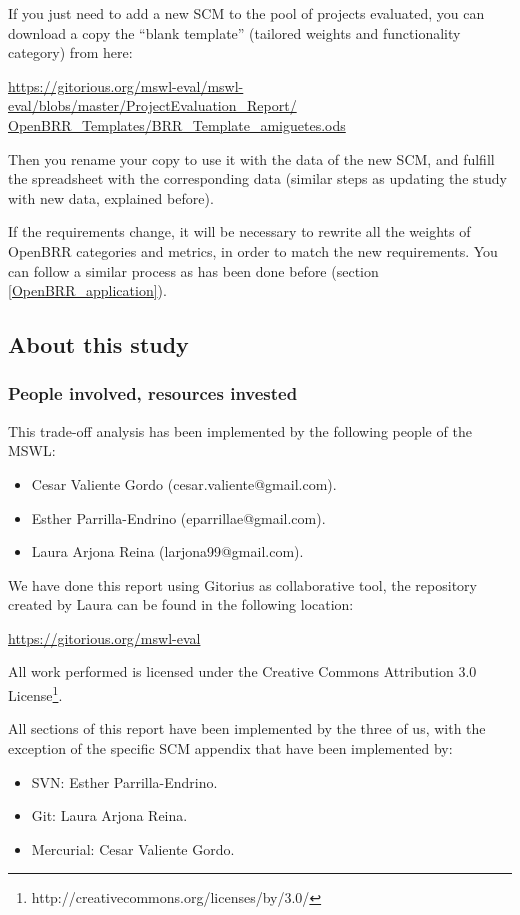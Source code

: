\documentclass[a4paper,10pt]{article}
\begin{document}
If you just need to add a new SCM to the pool of projects evaluated, you can
download a copy the ``blank template'' (tailored weights and functionality
category) from here:

 \url{
https://gitorious.org/mswl-eval/mswl-eval/blobs/master/ProjectEvaluation_Report/
OpenBRR_Templates/BRR_Template_amiguetes.ods}

Then you rename your copy to use it with the data of the new SCM, and fulfill
the spreadsheet with the corresponding data (similar steps as updating the
study with new data, explained before).


If the requirements change, it will be necessary to rewrite all the
weights of OpenBRR categories and metrics, in order to match the new
requirements. You can follow a similar process as has been done before (section
\ref{OpenBRR_application}).

\subsection{About this study}
\subsubsection{People involved, resources invested}
This trade-off analysis has been implemented by the following people of the MSWL:

\begin{itemize}
\item Cesar Valiente Gordo (cesar.valiente@gmail.com).
\item Esther Parrilla-Endrino (eparrillae@gmail.com).
\item Laura Arjona Reina (larjona99@gmail.com).
\end{itemize}

We have done this report using Gitorius as collaborative tool, the repository created by Laura can be found in the following location:

\url{https://gitorious.org/mswl-eval}

All work performed is licensed under the Creative Commons Attribution 3.0 License\footnote{http://creativecommons.org/licenses/by/3.0/}.

All sections of this report have been implemented by the three of us, with the exception of the specific SCM appendix that have been implemented by:

\begin{itemize}
\item SVN: Esther Parrilla-Endrino.
\item Git: Laura Arjona Reina.
\item Mercurial: Cesar Valiente Gordo.
\end{itemize}
\end{document}
